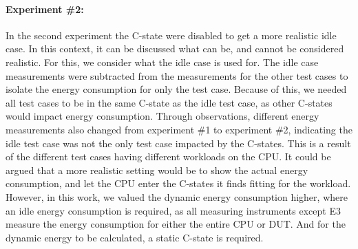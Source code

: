 \paragraph*{Experiment \#2:} In the second experiment the C-state were disabled to get a more realistic idle case. In this context, it can be discussed what can be, and cannot be considered realistic. For this, we consider what the idle case is used for. The idle case measurements were subtracted from the measurements for the other test cases to isolate the energy consumption for only the test case. Because of this, we needed all test cases to be in the same C-state as the idle test case, as other C-states would impact energy consumption. Through observations, different energy measurements also changed from experiment \#1 to experiment \#2, indicating the idle test case was not the only test case impacted by the C-states. This is a result of the different test cases having different workloads on the CPU. It could be argued that a more realistic setting would be to show the actual energy consumption, and let the CPU enter the C-states it finds fitting for the workload. However, in this work, we valued the dynamic energy consumption higher, where an idle energy consumption is required, as all measuring instruments except E3 measure the energy consumption for either the entire CPU or DUT. And for the dynamic energy to be calculated, a static C-state is required.


